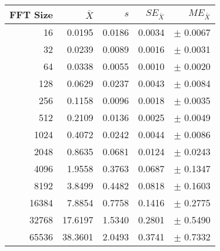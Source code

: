 \begin{tabular}{|r|r|r|r|r|}\hline
    FFT Size & $\bar{X}$ & $s$ & $SE_{\bar{X}}$ & $ME_{\bar{X}}$ \\ \hline
    16 & 0.0195 & 0.0186 & 0.0034 & $\pm$ 0.0067 \\ \hline
    32 & 0.0239 & 0.0089 & 0.0016 & $\pm$ 0.0031 \\ \hline
    64 & 0.0338 & 0.0055 & 0.0010 & $\pm$ 0.0020 \\ \hline
    128 & 0.0629 & 0.0237 & 0.0043 & $\pm$ 0.0084 \\ \hline
    256 & 0.1158 & 0.0096 & 0.0018 & $\pm$ 0.0035 \\ \hline
    512 & 0.2109 & 0.0136 & 0.0025 & $\pm$ 0.0049 \\ \hline
    1024 & 0.4072 & 0.0242 & 0.0044 & $\pm$ 0.0086 \\ \hline
    2048 & 0.8635 & 0.0681 & 0.0124 & $\pm$ 0.0243 \\ \hline
    4096 & 1.9558 & 0.3763 & 0.0687 & $\pm$ 0.1347 \\ \hline
    8192 & 3.8499 & 0.4482 & 0.0818 & $\pm$ 0.1603 \\ \hline
    16384 & 7.8854 & 0.7758 & 0.1416 & $\pm$ 0.2775 \\ \hline
    32768 & 17.6197 & 1.5340 & 0.2801 & $\pm$ 0.5490 \\ \hline
    65536 & 38.3601 & 2.0493 & 0.3741 & $\pm$ 0.7332 \\ \hline
\end{tabular}
